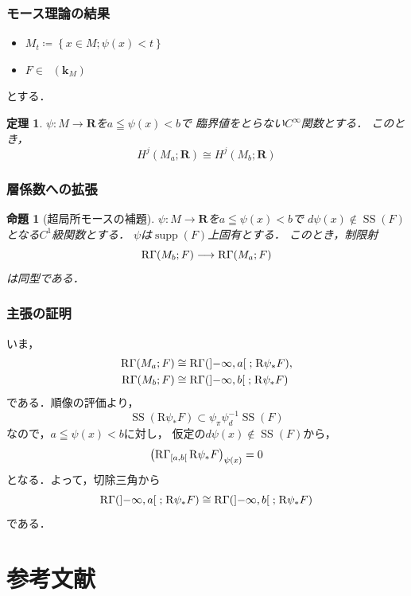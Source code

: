 \documentclass[dvipdfmx,10pt,aspectratio=169,leqno]{beamer}%
\makeatletter
\newcommand{\rr}{\mathbf{R}}
\newcommand{\kk}{\mathbf{k}}
\renewenvironment{proof}[1][\proofname]{\par
  \pushQED{\qed}%
  \normalfont \topsep6\p@\@plus6\p@\relax
  \trivlist
  \item[\hskip\labelsep
         \bfseries
    {#1}]\ignorespaces
}{%
  \popQED\endtrivlist\@endpefalse
}
\renewcommand{\proofname}{\textrm{Proof.}}
\numberwithin{equation}{subsection}
\newcommand{\supp}{\mathop{\mathrm{supp}}\nolimits}
\newcommand{\Dompb}{\mathop{\mathsf{D}^\mathrm{b}}\nolimits}
\newcommand{\muS}{\mathop{\mathrm{SS}}\nolimits}
\newcommand{\RG}{\mathop{\mathrm{R}\hspace{-0pt}\Gamma}\nolimits}
\newcommand{\Rder}{\mathrm{R}}
\newcommand{\mpb}[1][]{{#1}_{\pi}} %
\newcommand{\mdiff}[1][]{{#1}_{d}} %
\theoremstyle{mystyle}
\newtheorem{THM}[AXM]{定理}
\newtheorem{PRP}[AXM]{命題}
\makeatother
\begin{document}
\begin{frame}
    \frametitle{モース理論の結果}
    \begin{itemize}
        \item \(M_t\coloneqq\left\{x\in M;\psi(x)<t\right\}\)
        \item \(F\in\Dompb(\kk_M)\)
    \end{itemize}
    とする．
    \begin{THM}
        \(\psi\colon M\to \rr\)を\(a\leqq\psi(x)< b\)で
        臨界値をとらない\(C^\infty\)関数とする．
        このとき，\[H^j(M_a;\rr)\cong H^j(M_b;\rr)\]
    \end{THM}
\end{frame}

\begin{frame}
    \frametitle{層係数への拡張}
    \begin{PRP}[超局所モースの補題]
        \(\psi\colon M\to \rr\)を\(a\leqq\psi(x)< b\)で
        \(d\psi(x)\notin\muS(F)\)となる\(C^1\)級関数とする．
        \(\psi\)は\(\supp(F)\)上固有とする．
        このとき，制限射\[
            \RG(M_b;F)\longrightarrow\RG(M_a;F)
        \]は同型である．
    \end{PRP}    
\end{frame}

\begin{frame}
    \frametitle{主張の証明}
    \begin{proof}[\textbf{証明. }]
        いま，
        \begin{align*}
            \RG(M_a;F)&\cong\RG({\left]-\infty,a\right[}\mathrel{;}\Rder{\psi_{\ast}}F),\\
            \RG(M_b;F)&\cong\RG({\left]-\infty,b\right[}\mathrel{;}\Rder{\psi_{\ast}}F)        
        \end{align*}
        である．順像の評価より，
        \[
            \muS(\Rder{\psi_{\ast}}F)
            \subset
            \mpb[\psi]\mdiff[\psi]^{-1}\muS(F)
        \]
        なので，\(a\leqq\psi(x)<b\)に対し，
        仮定の\(d\psi(x)\notin\muS(F)\)から，
        \[
            \left(\RG_{[a,b[}\Rder{\psi_{\ast}}F\right)_{\psi(x)}=0
        \]
        となる．よって，切除三角から
        \[\RG({\left]-\infty,a\right[}\mathrel{;}\Rder{\psi_{\ast}}F)
        \cong
        \RG({\left]-\infty,b\right[}\mathrel{;}\Rder{\psi_{\ast}}F)
        \]
        である．
    \end{proof}
\end{frame}

\appendix
\section*{参考文献}
\end{document}
